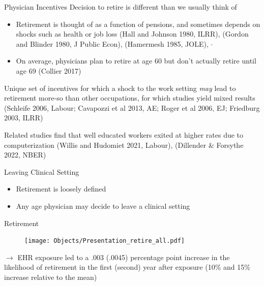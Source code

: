 \documentclass[10pt]{beamer}
\begin{document}
\begin{frame}{Physician Incentives}
Decision to retire is different than we usually think of
\vspace{3mm}
    \begin{itemize}
        \item Retirement is thought of as a function of pensions, and sometimes depends on shocks such as health or job loss
        \tiny (Hall and Johnson 1980, ILRR), (Gordon and Blinder 1980, J Public Econ), (Hamermesh 1985, JOLE), $\cdot$
        
        \vspace{3mm}
    
        \normalsize \item On average, physicians plan to retire at age 60 but don't actually retire until age 69 \tiny(Collier 2017)
    \end{itemize}
    
\vspace{3mm}
\pause

\normalsize Unique set of incentives for which a shock to the work setting \textit{may} lead to retirement more-so than other occupations, for which studies yield mixed results  \tiny (Schleife 2006, Labour; Cavapozzi et al 2013, AE; Roger et al 2006, EJ; Friedburg 2003, ILRR)

\vspace{3mm}
\pause

\normalsize Related studies find that well educated workers exited at higher rates due to computerization \tiny (Willis and Hudomiet 2021, Labour), (Dillender & Forsythe 2022, NBER)
\end{frame}



\begin{frame}{Leaving Clinical Setting}
    \begin{itemize}
        \item Retirement is loosely defined
        \vspace{5mm}
        \item Any age physician may decide to leave a clinical setting
    \end{itemize}
\end{frame}

\begin{frame}{Retirement}
\begin{figure}[ht]
    \centering
    \texttt{[image: Objects/Presentation\_retire\_all.pdf]}
\end{figure}
$\rightarrow$ EHR exposure led to a .003 (.0045) percentage point increase in the likelihood of retirement in the first (second) year after exposure (10\% and 15\% increase relative to the mean)
\end{frame}
\end{document}

